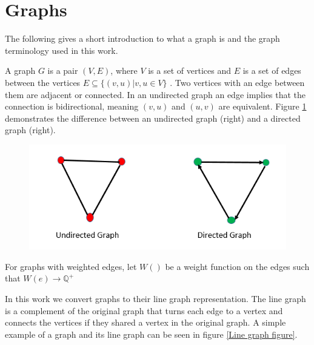 \section{Graphs}

The following gives a short introduction to what a graph is and the graph terminology used in this work.

A graph $G$ is a pair $(V,E)$, where $V$ is a set of vertices and $E$ is a set of edges between the vertices $E \subseteq \{(v,u) |  v,u \in V\}$ \cite{graphdef}. Two vertices with an edge between them are adjacent or connected. In an undirected graph an edge implies that the connection is bidirectional, meaning $(v,u)$ and $(u,v)$ are equivalent. Figure \ref{The difference between a directed and an undirected graph} demonstrates the difference between an undirected graph (right) and a directed graph (right).

\begin{figure}[H]
    \centering
    \includegraphics[scale=0.7]{figures/graph-theory}
    \label{The difference between a directed and an undirected graph}
\end{figure}

For graphs with weighted edges, let $W()$ be a weight function on the edges such that $W(e) \rightarrow \mathbb{Q}^+$ 

In this work we convert graphs to their line graph representation. The line graph is a complement of the original graph that turns each edge to a vertex and connects the vertices if they shared a vertex in the original graph. A simple example of a graph and its line graph can be seen in figure \ref{Line graph figure}.

